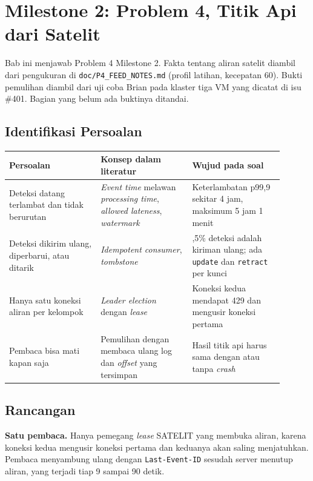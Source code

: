\chapter[MILESTONE 2: PROBLEM 4]{Milestone 2: Problem 4, Titik Api dari Satelit}

Bab ini menjawab Problem 4 Milestone 2. Fakta tentang aliran satelit diambil dari pengukuran di \texttt{doc/P4\_FEED\_NOTES.md} (profil latihan, kecepatan 60). Bukti pemulihan diambil dari uji coba Brian pada klaster tiga VM yang dicatat di isu \#401. Bagian yang belum ada buktinya ditandai.

\section{Identifikasi Persoalan}

\begin{longtable}[]{|>{\raggedright\arraybackslash}p{0.3\linewidth}|>{\raggedright\arraybackslash}p{0.3\linewidth}|>{\raggedright\arraybackslash}p{0.3\linewidth}|}
\hline
\textbf{Persoalan} & \textbf{Konsep dalam literatur} & \textbf{Wujud pada soal} \\
\hline
\endhead
Deteksi datang terlambat dan tidak berurutan & \textit{Event time} melawan \textit{processing time}, \textit{allowed lateness}, \textit{watermark} & Keterlambatan p99,9 sekitar 4 jam, maksimum 5 jam 1 menit \\
\hline
Deteksi dikirim ulang, diperbarui, atau ditarik & \textit{Idempotent consumer}, \textit{tombstone} & 6,5\% deteksi adalah kiriman ulang; ada \texttt{update} dan \texttt{retract} per kunci \\
\hline
Hanya satu koneksi aliran per kelompok & \textit{Leader election} dengan \textit{lease} & Koneksi kedua mendapat 429 dan mengusir koneksi pertama \\
\hline
Pembaca bisa mati kapan saja & Pemulihan dengan membaca ulang log dan \textit{offset} yang tersimpan & Hasil titik api harus sama dengan atau tanpa \textit{crash} \\
\hline
\end{longtable}

\section{Rancangan}

\textbf{Satu pembaca.} Hanya pemegang \textit{lease} SATELIT yang membuka aliran, karena koneksi kedua mengusir koneksi pertama dan keduanya akan saling menjatuhkan. Pembaca menyambung ulang dengan \texttt{Last-Event-ID} sesudah server menutup aliran, yang terjadi tiap 9 sampai 90 detik.

